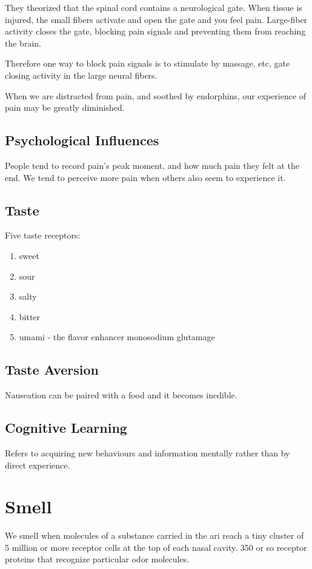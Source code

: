 \documentclass[12pt]{article}
\begin{document}
They theorized that the spinal cord contains a neurological gate. When tissue is injured, the small fibers activate and open the gate and you feel pain. Large-fiber activity closes the gate, blocking pain signals and preventing them from reaching the brain.

Therefore one way to block pain signals is to stimulate by massage, etc, gate closing activity in the large neural fibers. 

When we are distracted from pain, and soothed by endorphins, our experience of pain may be greatly diminished. 

\subsection*{Psychological Influences}
People tend to record pain's peak moment, and how much pain they felt at the end. We tend to perceive more pain when others also seem to experience it. 

\subsection*{Taste}
Five taste receptors:
\begin{enumerate}
  \item sweet
  \item sour
  \item salty
  \item bitter
  \item umami - the flavor enhancer monosodium glutamage
\end{enumerate}
\subsection*{Taste Aversion}
Nauseation can be paired with a food and it becomes inedible. 

\subsection*{Cognitive Learning}
Refers to acquiring new behaviours and information mentally rather than by direct experience. 

\section*{Smell}
We smell when molecules of a substance carried in the ari reach a tiny cluster of 5 million or more receptor cells at the top of each nasal cavity. 350 or so receptor proteins that recognize particular odor molecules.
\end{document}
